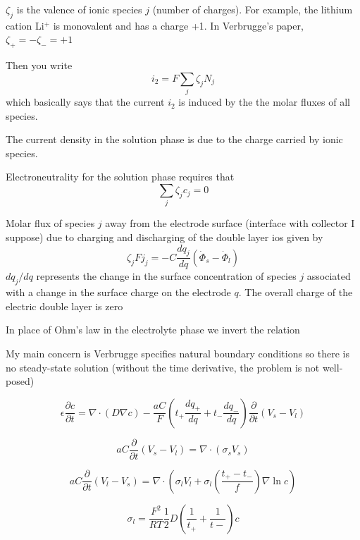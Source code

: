 \documentclass[10pt, oneside]{article}   	%
\begin{document}
$\zeta_j$ is the valence of ionic species $j$ (number of charges).  For example,
the lithium cation Li$^+$ is monovalent and has a charge +1.
In Verbrugge's paper, $\zeta_+ = -\zeta_- = +1$

Then you write
\begin{equation}
i_2 = F \sum_j \zeta_j N_j
\end{equation}
which basically says that the current $i_2$ is induced by the the molar fluxes
of all species.

The current density in the solution phase is due to the charge carried by
ionic species.

Electroneutrality for the solution phase requires that
\begin{equation}
\sum_j \zeta_j c_j = 0
\end{equation}


Molar flux of species $j$ away from the electrode surface (interface with
collector I suppose) due to charging and discharging of the double layer ios
given by
\begin{equation}
\zeta_j F j_j = -C \frac{dq_j}{dq} (\dot{\Phi}_s - \dot{\Phi}_l)
\end{equation}
$dq_j/dq$ represents the change in the surface concentration of species $j$
associated with a change in the surface charge on the electrode $q$.
The overall charge of the electric double layer is zero


In place of Ohm's law in the electrolyte phase we invert the relation 

My main concern is Verbrugge specifies natural boundary conditions so there is
no steady-state solution (without the time derivative, the problem is not
well-posed)

\begin{equation}
\epsilon \frac{\partial c}{\partial t} = 
\nabla \cdot (D \nabla c)
- \frac{aC}{F} (t_+ \frac{dq_+}{dq} + t_- \frac{dq_-}{dq})
\frac{\partial}{\partial t}(V_s - V_l)
\end{equation}

\begin{equation}
aC \frac{\partial}{\partial t} (V_s - V_l) = \nabla \cdot (\sigma_s V_s)
\end{equation}

\begin{equation}
aC \frac{\partial}{\partial t} (V_l - V_s) = \nabla \cdot (\sigma_l V_l 
+ \sigma_l (\frac{t_+ - t_-}{f}) \nabla \ln c)
\end{equation}

\begin{equation}
\sigma_l = \frac{F^2}{RT} \frac{1}{2} D \left( \frac{1}{t_+} + \frac{1}{t-} \right) c
\end{equation}
\end{document}
